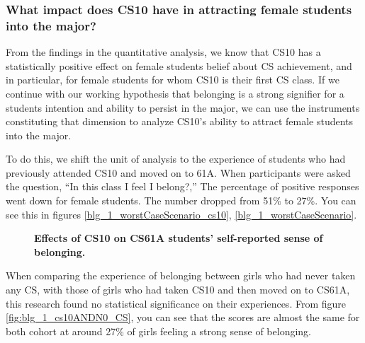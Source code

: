 \documentclass[twoside,openright,titlepage,numbers=noenddot,headinclude,%
               footinclude=true,cleardoublepage=empty,abstractoff,BCOR=5mm,%
               paper=a4,fontsize=11pt,ngerman,american]{scrreprt}
\numberwithin{theorem}{chapter}
\numberwithin{definition}{chapter}
\numberwithin{algorithm}{chapter}
\numberwithin{figure}{chapter}
\numberwithin{table}{chapter}
\numberwithin{equation}{chapter}
\begin{document}
\subsubsection *{What impact does CS10 have in attracting female students into the major?}

From the findings in the quantitative analysis, we know that CS10 has a statistically positive effect on female students belief about CS achievement, and in particular, for female students for whom CS10 is their first CS class. If we continue with our working hypothesis that belonging is a strong signifier for a students intention and ability to persist in the major, we can use the instruments constituting that dimension to analyze CS10's ability to attract female students into the major.

To do this, we shift the unit of analysis to the experience of students who had previously attended CS10 and moved on to 61A. When participants were asked the question, ``In this class I feel I belong?,'' The percentage of positive responses went down for female students. The number dropped from 51\% to 27\%. You can see this in figures \ref{blg_1_worstCaseScenario_cs10}, \ref{blg_1_worstCaseScenario}. 

\begin{figure}[!htbp]
    \centering 
    \qquad
%

%
\caption{\textbf{Effects of CS10 on CS61A students' self-reported sense of belonging.}}
\label{fig:blg_1_cs10_cs61a}
\end{figure}

When comparing the experience of belonging between girls who had never taken any CS, with those of girls who had taken CS10 and then moved on to CS61A, this research found no statistical significance on their experiences. From figure \ref{fig:blg_1_cs10ANDN0_CS}, you can see that the scores are almost the same for both cohort at around 27\% of girls feeling a strong sense of belonging.
\end{document}
